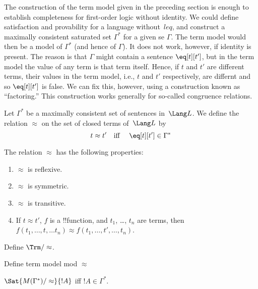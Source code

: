 \documentclass[../../include/open-logic-section]{subfiles}
\begin{document}

\begin{explain}
The construction of the term model given in the preceding section is
enough to establish completeness for first-order logic without
identity.  We could define satisfaction and provability for a language
without~$leq$, and construct a maximally consistent saturated set
$\Gamma^*$ for a given se $\Gamma$.  The term model would then be a
model of $\Gamma^*$ (and hence of $\Gamma$).  It does not work,
however, if identity is present.  The reason is that $\Gamma$ might
contain a sentence $\eq[t][t']$, but in the term model the value of
any term is that term itself. Hence, if $t$ and $t'$ are different
terms, their values in the term model, i.e., $t$ and $t'$
respectively, are differnt and so $\eq[t][t']$ is false.  We can fix
this, however, using a construction known as ``factoring.''  This
construction works generally for so-called congruence relations.
\end{explain}

\begin{defn}
Let $\Gamma^*$ be a maximally consistent set of sentences in~$\Lang
L$. We define the relation $\approx$ on the set of closed terms
of~$\Lang L$ by
\[
t \approx t' \text{\quad iff \quad} \eq[t][t'] \in \Gamma^*
\]
\end{defn}

\begin{prop}
The relation $\approx$ has the following properties:
\begin{enumerate}
\item $\approx$ is reflexive.
\item $\approx$ is symmetric.
\item  $\approx$ is transitive.
\item If $t \approx t'$, $f$ is a !!{function}, and $t_1$, \dots,
  $t_n$ are terms, then $f(t_1,\dots, t, \dots t_n) \approx f(t_1,
  \dots, t', \dots, t_n)$.
\end{enumerate}
\end{prop}


\begin{defn}
Define $\Trm/\approx$.
\end{defn}

\begin{defn}
Define term model mod $\approx$
\end{defn}

\begin{prop}
$\Sat{M(\Gamma^*)/\approx}{!A}$ iff $!A \in \Gamma^*$.
\end{prop}
\end{document}
